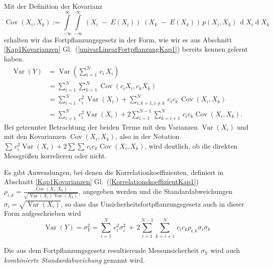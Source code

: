 Mit der Definition der Kovarianz
$$
\operatorname {Cov}(X_{i},X_{k}) :=
\int\limits_{-\infty}^{\infty} \int\limits_{-\infty}^{\infty}
\, \left(X_i \; - \; E(X_i)\right) \;
      \left(X_k \; - \; E(X_k)\right) \, p(X_i, X_k)
\, \operatorname{d}X_i \operatorname{d}X_k
$$
erhalten wir das Fortpflanzungsgesetz in der Form, wie wir es aus Abschnitt \ref{Kap1Kovarianzen}
Gl.~(\ref{univarLinearFortpflanzungKap1}) bereits kennen gelernt haben.
\begin{equation}
{\begin{aligned}
\operatorname {Var}\left(Y\right) & =
\operatorname {Var}\left(\sum _{{i=1}}^{N} \, c_i \, X_{i}\right) \\
 & = \sum _{i=1}^{N}\sum _{k=1}^{N}\operatorname {Cov}(c_i X_{i}, c_k X_{k})\\
 & = \sum _{{i=1}}^{N} \, c_i^2 \, \operatorname {Var}(X_{i})+
     \sum _{{i,k=1,i\neq k}}^{N} \, c_i c_k \,  \operatorname {Cov}(X_{i},X_{k})\\
& = \sum _{{i=1}}^{N} \, c_i^2 \operatorname {Var}(X_{i})+2\sum _{{i=1}}^{{N-1}}
  \sum _{{k=i+1}}^{N} \, c_i c_k \operatorname {Cov}(X_{i},X_{k}).
\end{aligned}}
\label{univarLinearFortpflanzungKap7}
\end{equation}
Bei getrennter Betrachtung der beiden Terme mit den Varianzen $\operatorname {Var}(X_{i})$
und mit den Kovarianzen $\operatorname {Cov}(X_{i},X_{k})$, also
in der Notation $\sum \, c_i^2 \operatorname {Var}(X_{i})+2\sum
 \sum \, c_i c_k \operatorname {Cov}(X_{i},X_{k})$, wird deutlich, ob
die direkten Messgrößen korrelieren oder nicht.

Es gibt Anwendungen, bei denen die Korrelationkoeffizienten, definiert in
Abschnitt \ref{Kap1Kovarianzen} Gl.~(\ref{KorrelationskoeffizientKap1})
$\rho_{i,k} = \frac{\operatorname {Cov}(X_{i},X_{k})}{\sqrt{\operatorname {Var}(X_{i}) \operatorname {Var}(X_{k})}}$,
angegeben werden und die Standardabweichungen $\sigma_i = \sqrt{\operatorname {Var}(X_{i})}$, so dass 
das Unsicherheitsfortpflanzungsgesetz auch in dieser Form aufgeschrieben wird
\begin{equation}
\operatorname {Var}\left(Y\right) = \sigma_Y^2  = 
\sum _{{i=1}}^{N} \, c_i^2 \sigma_i^2 \, + \, 2\sum _{{i=1}}^{{N-1}}
  \sum _{{k=i+1}}^{N} \, c_i c_k \rho_{i,k} \sigma_i \sigma_k 
\label{FortpflaKorrStd}
\end{equation}

Die aus dem Fortpflanzungsgesetz resultierende Messunsicherheit $\sigma_Y$ wird auch
\textsl{kombinierte Standardabweichung} genannt wird.

